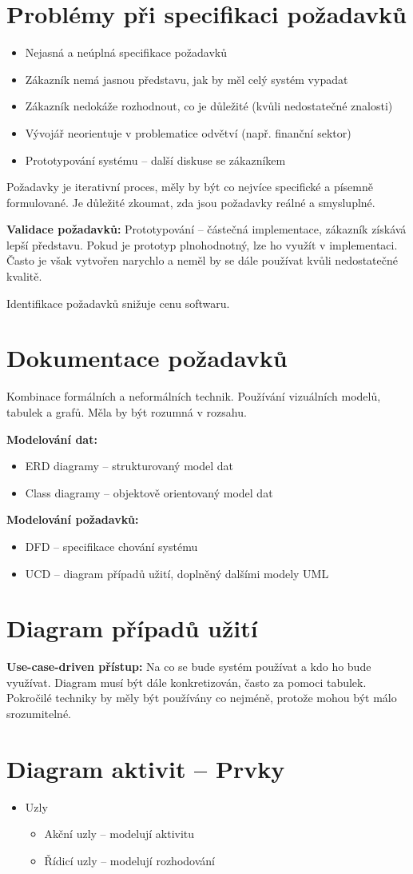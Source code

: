 \documentclass{article}
\begin{document}
\section{Problémy při specifikaci požadavků}
\begin{itemize}
    \item Nejasná a neúplná specifikace požadavků
    \item Zákazník nemá jasnou představu, jak by měl celý systém vypadat
    \item Zákazník nedokáže rozhodnout, co je důležité (kvůli nedostatečné znalosti)
    \item Vývojář neorientuje v problematice odvětví (např. finanční sektor)
    \item Prototypování systému – další diskuse se zákazníkem
\end{itemize}
Požadavky je iterativní proces, měly by být co nejvíce specifické a písemně formulované. Je důležité zkoumat, zda jsou požadavky reálné a smysluplné.

\textbf{Validace požadavků:}
Prototypování – částečná implementace, zákazník získává lepší představu. Pokud je prototyp plnohodnotný, lze ho využít v implementaci. Často je však vytvořen narychlo a neměl by se dále používat kvůli nedostatečné kvalitě.

Identifikace požadavků snižuje cenu softwaru.

\section{Dokumentace požadavků}
Kombinace formálních a neformálních technik. Používání vizuálních modelů, tabulek a grafů. Měla by být rozumná v rozsahu.

\textbf{Modelování dat:}
\begin{itemize}
    \item ERD diagramy – strukturovaný model dat
    \item Class diagramy – objektově orientovaný model dat
\end{itemize}

\textbf{Modelování požadavků:}
\begin{itemize}
    \item DFD – specifikace chování systému
    \item UCD – diagram případů užití, doplněný dalšími modely UML
\end{itemize}

\section{Diagram případů užití}
\textbf{Use-case-driven přístup:}
Na co se bude systém používat a kdo ho bude využívat. Diagram musí být dále konkretizován, často za pomoci tabulek. Pokročilé techniky by měly být používány co nejméně, protože mohou být málo srozumitelné.

\section{Diagram aktivit – Prvky}
\begin{itemize}
    \item Uzly
    \begin{itemize}
        \item Akční uzly – modelují aktivitu
        \item Řídicí uzly – modelují rozhodování
    \end{itemize}
\end{itemize}
\end{document}
